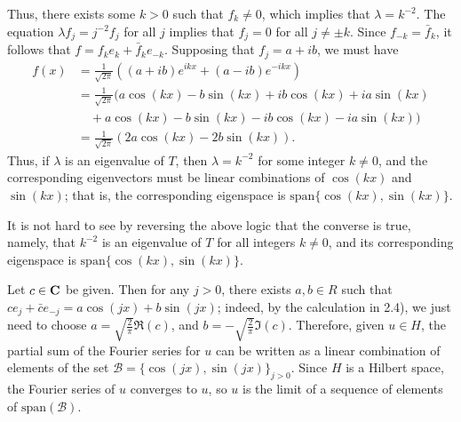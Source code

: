 \documentclass{homework}
\begin{document}
\begin{arabicparts}
		Thus, there exists some $k > 0$ such that $f_{k} \ne0$, which implies that $\lambda = k^{-2}$. The equation $\lambda f_j = j^{-2}f_j$ for all $j$ implies that $f_j = 0$ for all $j \ne \pm k$. Since $f_{-k} = \bar{f}_{k}$, it follows that $f = f_{k}e_{k} + \bar{f}_ke_{-k}$. Supposing that $f_j = a + ib$, we must have
		\begin{align}
			f(x) &= \frac{1}{\sqrt{2\pi}}\left((a+ib)e^{ikx} + (a-ib)e^{-ikx}\right) \\
			&= \frac{1}{\sqrt{2\pi}}\big(a\cos(kx) - b\sin(kx) +ib\cos(kx) + ia\sin(kx)\\
			&\quad{}+ a\cos(kx) -b\sin(kx) - ib\cos(kx) -ia\sin(kx)\big) \\
			&= \frac{1}{\sqrt{2\pi}}\left(2a\cos(kx) - 2b\sin(kx)\right).
		\end{align}
		Thus, if $\lambda$ is an eigenvalue of $T$, then $\lambda = k^{-2}$ for some integer $k\ne0$, and the corresponding eigenvectors must be linear combinations of $\cos(kx)$ and $\sin(kx)$; that is, the corresponding eigenspace is $\mathrm{span}\{\cos(kx), \sin(kx)\}$. 
		
		It is not hard to see by reversing the above logic that the converse is true, namely, that $k^{-2}$ is an eigenvalue of $T$ for all integers $k \ne0$, and its corresponding eigenspace is $\mathrm{span}\{\cos(kx),\sin(kx)\}$.
		
		\questionpart
		Let $c \in \textnormal{\bf C}$ be given. Then for any $j > 0$, there exists $a,b \in R$ such that $ce_j + \bar{c}e_{-j} = a\cos(jx) + b\sin(jx)$; indeed, by the calculation in 2.4), we just need to choose $a = \sqrt{\frac{2}{\pi}}\Re(c)$, and $b = -\sqrt{\frac{2}{\pi}}\Im(c)$. Therefore, given $u \in H$, the partial sum of the Fourier series for $u$ can be written as a linear combination of elements of the set $\mathcal{B} = \{\cos(jx),\sin(jx)\}_{j>0}$. Since $H$ is a Hilbert space, the Fourier series of $u$ converges to $u$, so $u$ is the limit of a sequence of elements of $\mathrm{span}(\mathcal{B})$.
		

\end{arabicparts}
\end{document}
